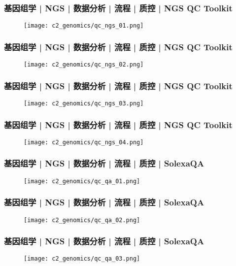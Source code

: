 \begin{frame}
  \frametitle{基因组学 | NGS | 数据分析 | 流程 | 质控 | NGS QC Toolkit}
  \begin{figure}
    \centering
    \texttt{[image: c2\_genomics/qc\_ngs\_01.png]}
  \end{figure}
\end{frame}

\begin{frame}
  \frametitle{基因组学 | NGS | 数据分析 | 流程 | 质控 | NGS QC Toolkit}
  \begin{figure}
    \centering
    \texttt{[image: c2\_genomics/qc\_ngs\_02.png]}
  \end{figure}
\end{frame}

\begin{frame}
  \frametitle{基因组学 | NGS | 数据分析 | 流程 | 质控 | NGS QC Toolkit}
  \begin{figure}
    \centering
    \texttt{[image: c2\_genomics/qc\_ngs\_03.png]}
  \end{figure}
\end{frame}

\begin{frame}
  \frametitle{基因组学 | NGS | 数据分析 | 流程 | 质控 | NGS QC Toolkit}
  \begin{figure}
    \centering
    \texttt{[image: c2\_genomics/qc\_ngs\_04.png]}
  \end{figure}
\end{frame}

\begin{frame}
  \frametitle{基因组学 | NGS | 数据分析 | 流程 | 质控 | SolexaQA}
  \begin{figure}
    \centering
    \texttt{[image: c2\_genomics/qc\_qa\_01.png]}
  \end{figure}
\end{frame}

\begin{frame}
  \frametitle{基因组学 | NGS | 数据分析 | 流程 | 质控 | SolexaQA}
  \begin{figure}
    \centering
    \texttt{[image: c2\_genomics/qc\_qa\_02.png]}
  \end{figure}
\end{frame}

\begin{frame}
  \frametitle{基因组学 | NGS | 数据分析 | 流程 | 质控 | SolexaQA}
  \begin{figure}
    \centering
    \texttt{[image: c2\_genomics/qc\_qa\_03.png]}
  \end{figure}
\end{frame}


